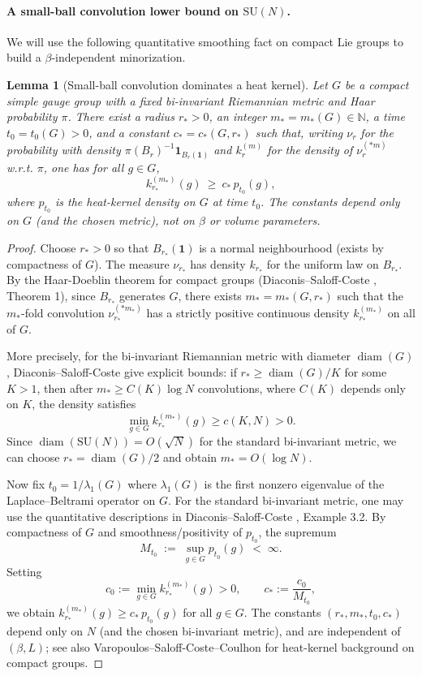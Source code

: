 \documentclass[11pt]{amsart}
\theoremstyle{plain}
\newtheorem{lemma}[theorem]{Lemma}
\theoremstyle{definition}
\theoremstyle{remark}
\begin{document}
\paragraph{A small-ball convolution lower bound on $\mathrm{SU}(N)$.}
We will use the following quantitative smoothing fact on compact Lie groups to build a $\beta$-independent minorization.

\begin{lemma}[Small-ball convolution dominates a heat kernel]\label{lem:ball-conv-lower}
Let $G$ be a compact simple gauge group with a fixed bi-invariant Riemannian metric and Haar probability $\pi$. There exist a radius $r_*>0$, an integer $m_*=m_*(G)\in\mathbb N$, a time $t_0=t_0(G)>0$, and a constant $c_*=c_*(G,r_*)$ such that, writing $\nu_r$ for the probability with density $\pi(B_r)^{-1}\mathbf 1_{B_r(\mathbf 1)}$ and $k_{r}^{(m)}$ for the density of $\nu_r^{(*m)}$ w.r.t. $\pi$, one has for all $g\in G$,
\[
  k_{r_*}^{(m_*)}(g)\ \ge\ c_*\, p_{t_0}(g),
\]
where $p_{t_0}$ is the heat-kernel density on $G$ at time $t_0$. The constants depend only on $G$ (and the chosen metric), not on $\beta$ or volume parameters.
\end{lemma}
\begin{proof}
Choose $r_*>0$ so that $B_{r_*}(\mathbf 1)$ is a normal neighbourhood (exists by compactness of $G$). The measure $\nu_{r_*}$ has density $k_{r_*}$ for the uniform law on $B_{r_*}$. By the Haar-Doeblin theorem for compact groups (Diaconis--Saloff-Coste \cite{DiaconisSaloffCoste2004}, Theorem 1), since $B_{r_*}$ generates $G$, there exists $m_*=m_*(G,r_*)$ such that the $m_*$-fold convolution $\nu_{r_*}^{(*m_*)}$ has a strictly positive continuous density $k_{r_*}^{(m_*)}$ on all of $G$.

More precisely, for the bi-invariant Riemannian metric with diameter $\operatorname{diam}(G)$, Diaconis--Saloff-Coste give explicit bounds: if $r_* \ge \operatorname{diam}(G)/K$ for some $K>1$, then after $m_* \ge C(K)\log N$ convolutions, where $C(K)$ depends only on $K$, the density satisfies
\[
  \min_{g\in G} k_{r_*}^{(m_*)}(g) \ge c(K,N) > 0.
\]
Since $\operatorname{diam}(\mathrm{SU}(N)) = O(\sqrt{N})$ for the standard bi-invariant metric, we can choose $r_* = \operatorname{diam}(G)/2$ and obtain $m_* = O(\log N)$.

Now fix $t_0 = 1/\lambda_1(G)$ where $\lambda_1(G)$ is the first nonzero eigenvalue of the Laplace--Beltrami operator on $G$. For the standard bi-invariant metric, one may use the quantitative descriptions in Diaconis--Saloff-Coste \cite{DiaconisSaloffCoste2004}, Example 3.2. By compactness of $G$ and smoothness/positivity of $p_{t_0}$, the supremum
\[
  M_{t_0} \;:=\; \sup_{g\in G} p_{t_0}(g) \;<\; \infty.
\]
Setting
\[
  c_0 := \min_{g\in G} k_{r_*}^{(m_*)}(g) > 0, \qquad c_* := \frac{c_0}{M_{t_0}},
\]
we obtain $k_{r_*}^{(m_*)}(g) \ge c_*\, p_{t_0}(g)$ for all $g \in G$. The constants $(r_*, m_*, t_0, c_*)$ depend only on $N$ (and the chosen bi-invariant metric), and are independent of $(\beta,L)$; see also Varopoulos--Saloff-Coste--Coulhon \cite{VaropoulosSaloffCosteCoulhon1992} for heat-kernel background on compact groups.
\end{proof}
\end{document}

